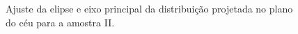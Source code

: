 \begin{anexosenv}
\begin{figure}[H]
\caption{Ajuste da elipse e eixo principal da distribuição projetada no plano do céu para a amostra II.}
\label{fig:eixonorotation}%
\end{figure}


\end{anexosenv}
